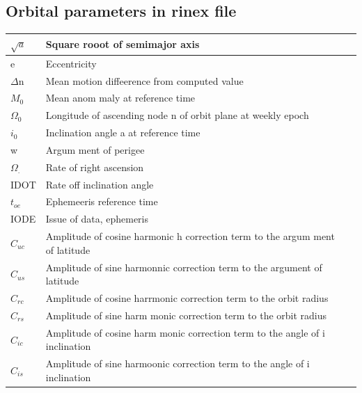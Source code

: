 \documentclass[journal,15pt,twocolumn]{IEEEtran}
\begin{document}
\subsection{Orbital parameters in rinex file}
\vspace{2mm}
\begin{tabular}{ | m{6em} | m{6cm}| m{6cm} | } 
  \hline
  $\sqrt{a}$   & Square rooot of semimajor axis \\
  \hline
  e & 
  Eccentricity \\  
  \hline
  $\Delta$n & Mean motion diffeerence from computed value  \\
  \hline
  $M_0$ & Mean anom
  maly at reference time \\
  \hline
  $\Omega_0$ & Longitude of ascending node
  n
  of orbit plane at weekly epoch  \\
  \hline
  $i_0$ & Inclination angle
  a
  at reference time   \\
  \hline
  w & Argum
  ment of perigee \\
  \hline
$\Omega_.$& Rate of right ascension  \\
  \hline
  IDOT & Rate off inclination angle  \\
  \hline
$t_{oe}$  & Ephemeeris reference time  \\
  \hline
  IODE  &  Issue of data, ephemeris \\
  \hline
  $C_{uc}$ & Amplitude of cosine harmonic
  h
  correction term to the
  argum
  ment of latitude   \\
  \hline
  $C_{us}$& Amplitude of sine harmonnic correction term to the argument
  of latitude \\
  \hline
  $C_{rc}$  &  Amplitude of cosine harrmonic correction term to the orbit
  radius \\
  \hline
  $C_{rs}$ & Amplitude of sine harm
  monic correction term to the orbit
  radius  \\
  \hline
  $C_{ic}$ & Amplitude of cosine harm
  monic correction term to the angle of
  i
  inclination \\
  \hline
  $C_{is}$ & Amplitude of sine harmoonic correction term to the angle of
  i
  inclination  \\
  \hline
\end{tabular}
\end{document}

